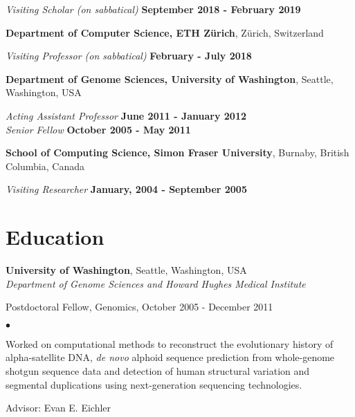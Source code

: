 \documentclass[margin,line]{res}
\newenvironment{list1}{
  \begin{list}{\ding{113}}{%
      \setlength{\itemsep}{0in}
      \setlength{\parsep}{0in} \setlength{\parskip}{0in}
      \setlength{\topsep}{0in} \setlength{\partopsep}{0in} 
      \setlength{\leftmargin}{0.17in}}}{\end{list}}
\newenvironment{list2}{
  \begin{list}{$\bullet$}{%
      \setlength{\itemsep}{0.1cm}
      \setlength{\parsep}{0in} \setlength{\parskip}{0in}
      \setlength{\topsep}{0in} \setlength{\partopsep}{0in} 
      \setlength{\leftmargin}{0.2in}}}{\end{list}}
\newcommand{\junk}[1]{}
\begin{document}
\begin{resume}
    \vspace{-.1cm}
        {\em Visiting Scholar (on sabbatical)} \hfill {\bf September 2018 - February 2019} 

    {\bf Department of Computer Science, ETH Zürich}, Zürich, Switzerland
                  
    \vspace{-.1cm}
        {\em Visiting Professor (on sabbatical)} \hfill {\bf February - July 2018} 
                         
    {\bf Department of Genome Sciences, University of Washington}, Seattle, Washington, USA
                         
    \vspace{-.3cm}
        {\em Acting Assistant Professor} \hfill {\bf June 2011 - January 2012} \\                           
        {\em Senior Fellow} \hfill {\bf October 2005 - May 2011}
                                       
    {\bf School of Computing Science, Simon Fraser University}, Burnaby, British Columbia, Canada

    \vspace{-.3cm}
        {\em Visiting Researcher} \hfill {\bf January, 2004 - September 2005}\\
                                         \junk{
                                         Worked on RNA-RNA interaction prediction algorithms and RNA secondary structure
                                         motif discovery problems, collaborating with Peter Unrau, Kaizhong
                                         Zhang, and Jeremy Buhler.
                                         }
                                                                              
\section{\sc Education}
    {\bf University of Washington}, Seattle, Washington, USA\\
        {\em Department of Genome Sciences and Howard Hughes Medical Institute} \\
        \vspace*{-.1in}
        \begin{list1}
            \item[] Postdoctoral Fellow, Genomics, October 2005 - December 2011
            \begin{list2}
                \vspace*{.05in}
                \item
                    Worked on computational methods to reconstruct the evolutionary history of alpha-satellite DNA, {\it de novo} alphoid sequence prediction
                    from whole-genome shotgun sequence data and detection of human structural variation and segmental duplications using next-generation
                    sequencing technologies.
                \item Advisor: Evan E. Eichler
            \end{list2}
        \end{list1}
          

\end{resume}
\end{document}

